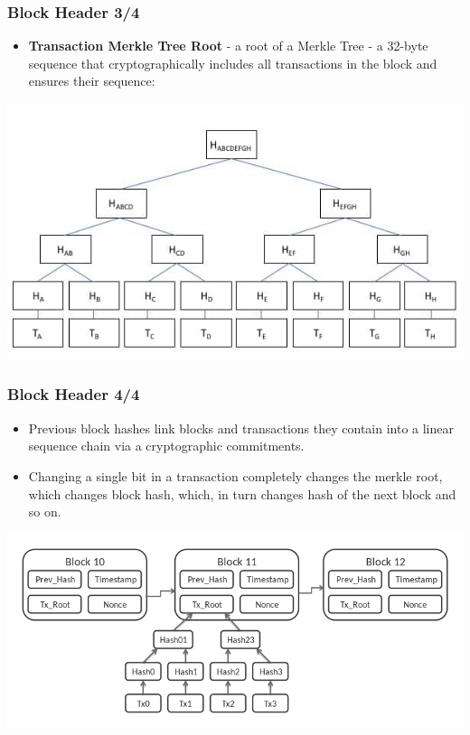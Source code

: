 \documentclass{beamer}
\begin{document}
\begin{frame}
  \frametitle{Block Header 3/4}
  \begin{itemize}
  \item \textbf{Transaction Merkle Tree Root} - a root of a Merkle Tree - a
    32-byte sequence that cryptographically includes all transactions in the
    block and ensures their sequence:
  \end{itemize}
  \includegraphics[width=\textwidth]{merkletree}
\end{frame}

\begin{frame}
  \frametitle{Block Header 4/4}
  \begin{itemize}
  \item Previous block hashes link blocks and transactions they contain into a
    linear sequence chain via a cryptographic commitments.
  \item Changing a single bit in a transaction completely changes the merkle
    root, which changes block hash, which, in turn changes hash of the next
    block and so on.
  \end{itemize}
  \includegraphics[width=\textwidth]{block-chain}
\end{frame}
\end{document}

